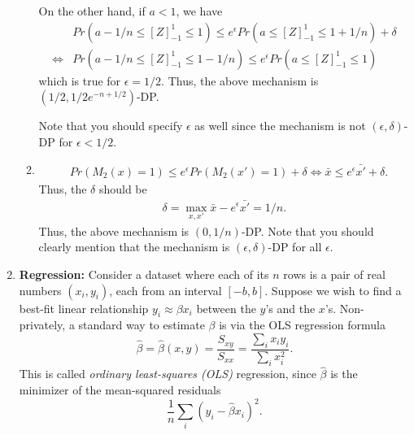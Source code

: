 \documentclass[12pt]{article}
\begin{document}
\begin{enumerate}
\begin{solution}
\begin{enumerate}
    On the other hand, if $a<1$, we have
    \begin{align*}
        &Pr(a-1/n\leq [Z]_{-1}^1\leq 1) \leq e^\epsilon Pr(a\leq [Z]_{-1}^1\leq 1+1/n) + \delta\\
        \Leftrightarrow &  Pr(a-1/n\leq [Z]_{-1}^1\leq 1-1/n) \leq e^\epsilon Pr(a\leq [Z]_{-1}^1\leq 1) 
    \end{align*}
    which is true for $\epsilon = 1/2$.
    Thus, the above mechanism is $(1/2, 1/2 e^{-n+1/2})$-DP.

    Note that you should specify $\epsilon$ as well since the mechanism is not $(\epsilon, \delta)$-DP for $\epsilon<1/2$.

    \item 
    \begin{align*}
        &Pr(M_2(x) = 1) \leq e^\epsilon Pr(M_2(x')=1)+\delta
        \Leftrightarrow \bar{x} \leq e^\epsilon \bar{x'} + \delta.
    \end{align*}
    Thus, the $\delta$ should be
    \begin{align*}
        \delta = \max_{x, x'} \bar{x} - e^\epsilon \bar{x'} = 1/n.
    \end{align*}
    Thus, the above mechanism is $(0, 1/n)$-DP. 
    Note that you should clearly mention that the mechanism is $(\epsilon, \delta)$-DP for all $\epsilon$.
    \end{enumerate}
\end{solution}

\begin{problem}
   \newpage 
\end{problem}
\begin{solution}
\vskip .2in
\end{solution}

\item \textbf{Regression: } 
Consider a dataset where each of its $n$ rows is a pair of real numbers $(x_i,y_i)$, each from an interval $[-b,b]$.
Suppose we wish to find a best-fit linear relationship $y_i \approx \beta x_i$ between the $y$'s and the $x$'s.
Non-privately, a standard way to estimate $\beta$ is via the OLS regression formula 
$$\hat{\beta} = \hat{\beta}(x,y) =  \frac{S_{xy}}{S_{xx}}
= \frac{\sum_i x_iy_i}{\sum_i x_i^2}.$$
This is called {\em ordinary least-squares (OLS)} regression, since $\hat{\beta}$ is the minimizer of the mean-squared residuals 
\begin{equation} \label{eqn:residuals}
    \frac{1}{n} \sum_i (y_i -\hat{\beta} x_i)^2.
\end{equation}


\end{enumerate}
\end{document}

